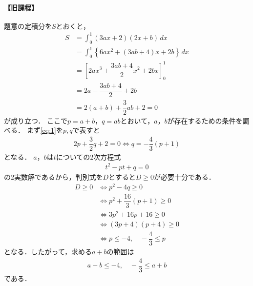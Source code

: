 \documentclass[../../main.tex]{subfiles}
\begin{document}
\paragraph{【旧課程】}
題意の定積分を$S$とおくと，
\begin{align}
  S &= \int_0^1 (3ax+2)(2x+b) \, dx \nonumber\\
  &= \int_0^1 \left\{ 6ax^2 + (3ab+4)x + 2b \right\} \, dx \nonumber\\
  &= \left[ 2ax^3 + \dfrac{3ab+4}{2}x^2 + 2bx \right]_0^1 \nonumber\\
  &= 2a + \dfrac{3ab+4}{2} + 2b \nonumber\\
  &= 2(a+b) + \dfrac{3}{2}ab + 2 = 0 \label{eq:1}
\end{align}
が成り立つ．
ここで$p = a+b$，$q = ab$とおいて，$a$，$b$が存在するための条件を調べる．
まず\cref{eq:1}を$p,q$で表すと
\begin{align}
  2p + \dfrac{3}{2}q + 2 = 0 \Longleftrightarrow q = -\dfrac{4}{3}(p+1) \label{eq:2}
\end{align}
となる．
$a$，$b$は$t$についての$2$次方程式
\begin{align}
  t^2 - pt + q = 0
\end{align}
の$2$実数解であるから，判別式を$D$とすると$D \ge 0$が必要十分である．
\begin{align}
  D \ge 0 &\Longleftrightarrow p^2 - 4q \ge 0 \nonumber\\
  &\Longleftrightarrow p^2 + \dfrac{16}{3}(p+1) \ge 0 \nonumber\\
  &\Longleftrightarrow 3p^2 + 16p + 16 \ge 0 \nonumber\\
  &\Longleftrightarrow (3p+4)(p+4) \ge 0 \nonumber\\
  &\Longleftrightarrow p \le -4, \quad -\dfrac{4}{3} \le p
\end{align}
となる．したがって，求める$a+b$の範囲は
\begin{align}
  a+b \le -4, \quad -\dfrac{4}{3} \le a+b \tag{答}
\end{align}
である．
\end{document}
